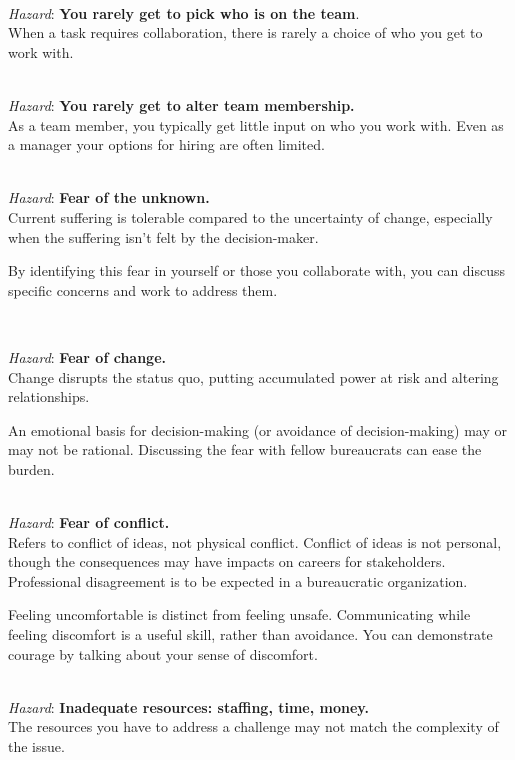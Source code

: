 \ \\
\textit{Hazard}: \textbf{You rarely get to pick who is on the team}. \\
When a task requires collaboration, there is rarely a choice of who you get to work with. 

\ \\
\textit{Hazard}: \textbf{You rarely get to alter team membership.}\\
As a team member, you typically get little input on who you work with. Even as a manager your options for hiring are often limited. 

\ \\
\textit{Hazard}: \textbf{Fear of the unknown.}\\
Current suffering is tolerable compared to the uncertainty of change, especially when the suffering isn't felt by the decision-maker.

By identifying this fear in yourself or those you collaborate with, you can discuss specific concerns and work to address them.

\ \\
\begin{samepage}
\textit{Hazard}: \textbf{Fear of change.} \\
Change disrupts the status quo, putting accumulated power at risk and altering relationships. 
\end{samepage}

An emotional basis for decision-making (or avoidance of decision-making) may or may not be rational. Discussing the fear with fellow bureaucrats can ease the burden. 

\ \\
\textit{Hazard}: \textbf{Fear of conflict.}\\
Refers to conflict of ideas, not physical conflict. Conflict of ideas is not personal, though the consequences may have impacts on careers for stakeholders. \\
Professional disagreement is to be expected in a bureaucratic organization.

Feeling uncomfortable is distinct from feeling unsafe. Communicating while feeling discomfort is a useful skill, rather than avoidance. You can demonstrate courage by talking about your sense of discomfort. 

\ \\
\textit{Hazard}: \textbf{Inadequate resources: staffing, time, money.}\\
The resources you have to address a challenge may not match the complexity of the issue.

